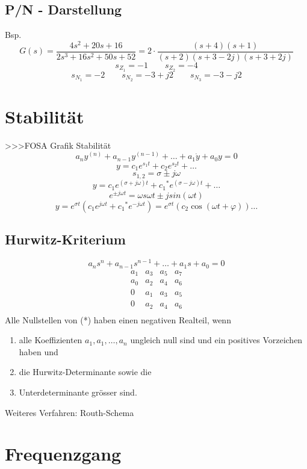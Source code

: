 \subsection{P/N - Darstellung}
Bsp. 
\[ G(s) = \frac{4 s^2 + 20s + 16}{2 s^3 + 16 s^2 + 50 s + 52} 
= 2 \cdot \frac{(s+4)(s+1)}{(s+2)(s+3-2j)(s+3+2j)} \]
\[ s_{Z_1} = -1 \qquad s_{Z_2} = -4 \]
\[ s_{N_1} = -2 \qquad s_{N_2} = -3 + j 2 \qquad s_{N_3} = -3 - j 2 \]

\section{Stabilität}
>>>FOSA Grafik Stabilität
\[ a_n y^{(n)} + a_{n-1} y^(n-1) + \ldots + a_1 \dot{y} + a_0 y = 0 \]
\[ y = c_1 e^{s_1 t} + c_2 e^{s_2 t} + \ldots \]
\[ s_{1, 2} = \sigma \pm j \omega \]
\[ y = c_1 e^{(\sigma + j \omega)t} + {c_1}^* e^{(\sigma - j \omega)t} + \ldots \]
\[ e^{\pm j \omega t} = \omega s \omega t \pm j sin(\omega t) \]
\[ y = e^{\sigma t}(c_1 e^{j \omega t} + {c_1}^* e^{-j \omega t}) 
= e^{\sigma t}(c_2 \cos(\omega t + \varphi))\ldots \]

\subsection{Hurwitz-Kriterium}
\[ a_n s^n + a_{n-1} s^{n-1} + \ldots + a_1 s + a_0 = 0 \]
\[ \begin{array}{cccc}
a_1 & a_3 & a_5 & a_7 \\
a_0 & a_2 & a_4 & a_6 \\
0   & a_1 & a_3 & a_5 \\
0   & a_2 & a_4 & a_6 \\
\end{array} \]
Alle Nullstellen von (*) haben einen negativen Realteil, wenn 
\begin{enumerate} 
  \item alle Koeffizienten $a_1, a_1, \ldots, a_n$ ungleich null sind und ein 
        positives Vorzeichen haben und 
  \item die Hurwitz-Determinante sowie die 
  \item Unterdeterminante grösser sind. 
\end{enumerate}
Weiteres Verfahren: Routh-Schema

\section{Frequenzgang}
